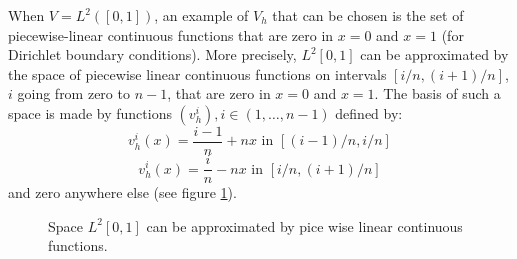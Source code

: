 \documentclass[12pt]{book}
\begin{document}
\begin{exmp}
When $V=L^2([0,1])$, an example of  $V_h$ that can be chosen
\cite{ma:equad:Ciarlet88} is the set of piecewise-linear continuous functions
that are zero in $x=0$ and $x=1$ (for Dirichlet boundary conditions).
More precisely,  $L^2[0,1]$ can be approximated by the space of piecewise
linear continuous functions on intervals $[i/n,(i+1)/n]$, $i$ 
going from zero to
$n-1$, that are zero in $x=0$ and $x=1$. The basis of such a space is made by
functions  $(v_h^i), i\in
(1,\dots,n-1)$ defined by: 
\begin{equation}
v_h^i(x)=\frac{i-1}{n}+nx\mbox{ in  } [(i-1)/n,i/n]
\end{equation}
\begin{equation}
v_h^i(x)=\frac{i}{n}-nx\mbox{ in  }  [i/n,(i+1)/n]
\end{equation}
and zero anywhere else (see figure \ref{figapproxesp}).
\begin{figure}[htb]
 \centerline{}   
 \caption{Space $L^2[0,1]$ can be approximated by pice wise linear continuous functions.}
 \label{figapproxesp}
\end{figure}
\end{exmp}
\end{document}
